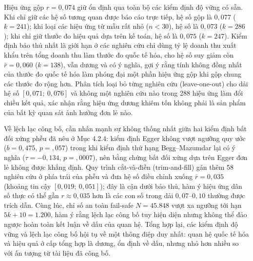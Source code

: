 \documentclass[
  a4paper,
  13pt]{extreport}
\begin{document}
Hiệu ứng gộp \(r = 0{,}074\) giữ ổn định qua toàn bộ các kiểm định độ
vững có sẵn. Khi chỉ giữ các hệ số tương quan được báo cáo trực tiếp, hệ
số gộp là \(0{,}077\) (\(k = 241\)); khi loại các hiệu ứng từ mẫu rất
nhỏ (\(n < 30\)), hệ số là \(0{,}073\) (\(k = 286\)); khi chỉ giữ thước
đo hiệu quả dựa trên kế toán, hệ số là \(0{,}075\) (\(k = 247\)). Kiểm
định bảo thủ nhất là giới hạn ở các nghiên cứu chỉ dùng tỷ lệ doanh thu
xuất khẩu trên tổng doanh thu làm thước đo quốc tế hóa, cho hệ số suy
giảm còn \(\bar{r} = 0{,}060\) (\(k = 138\)), vẫn dương và có ý nghĩa,
gợi ý rằng tính không đồng nhất của thước đo quốc tế hóa làm phóng đại
một phần hiệu ứng gộp khi gộp chung các thước đo rộng hơn. Phân tích
loại bỏ từng nghiên cứu (leave-one-out) cho dải hệ số
\([0{,}071;\ 0{,}076]\) và không một nghiên cứu nào trong 288 hiệu ứng
làm đổi chiều kết quả, xác nhận rằng hiệu ứng dương khiêm tốn không phải
là sản phẩm của bất kỳ quan sát ảnh hưởng đơn lẻ nào.

Về lệch lạc công bố, cần nhấn mạnh sự không thống nhất giữa hai kiểm
định bất đối xứng phễu đã nêu ở Mục 4.2.4: kiểm định Egger không vượt
ngưỡng quy ước (\(b = 0{,}475\), \(p = {,}057\)) trong khi kiểm định thứ
hạng Begg--Mazumdar lại có ý nghĩa (\(\tau = -0{,}134\),
\(p = {,}0007\)), nên bằng chứng bất đối xứng dựa trên Egger đơn lẻ
không được khẳng định. Quy trình cắt-và-điền (trim-and-fill) gán thêm 58
nghiên cứu ở phía trái của phễu và đưa hệ số điều chỉnh xuống
\(\bar{r} = 0{,}035\) (khoảng tin cậy \([0{,}019;\ 0{,}051]\)); đây là
cận dưới bảo thủ, hàm ý hiệu ứng dân số thực có thể gần
\(r \approx 0{,}035\) hơn là các con số trong dải \(0{,}07\)--\(0{,}10\)
thường được trích dẫn. Cùng lúc, chỉ số an toàn fail-safe \(N = 45.848\)
vượt xa ngưỡng tới hạn \(5k + 10 = 1.200\), hàm ý rằng lệch lạc công bố
tuy hiện diện nhưng không thể đảo ngược hoàn toàn kết luận về dấu của
quan hệ. Tổng hợp lại, các kiểm định độ vững và lệch lạc công bố hội tụ
về một thông điệp duy nhất: quan hệ quốc tế hóa và hiệu quả ở cấp tổng
hợp là dương, ổn định về dấu, nhưng nhỏ hơn nhiều so với ấn tượng từ tài
liệu đã công bố.
\end{document}
